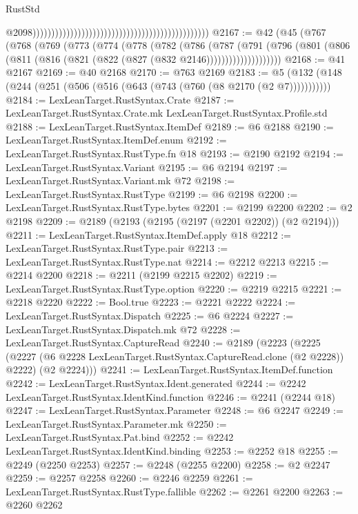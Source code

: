 \begin{lexlean}{RustStd}
\begin{coremodule}
                                                                                                  @2098)))))))))))))))))))))))))))))))))))))))))))))))
@2167 := @42
    (@45
      (@767
        (@768
          (@769
            (@773
              (@774
                (@778
                  (@782
                    (@786
                      (@787
                        (@791
                          (@796
                            (@801
                              (@806 (@811 (@816 (@821 (@822 (@827 (@832 @2146))))))))))))))))))))
@2168 := @41 @2167
@2169 := @40 @2168
@2170 := @763 @2169
@2183 := @5 (@132 (@148 (@244 (@251 (@506 (@516 (@643 (@743 (@760 (@8 @2170 (@2 @7)))))))))))
@2184 := LexLeanTarget.RustSyntax.Crate
@2187 := LexLeanTarget.RustSyntax.Crate.mk LexLeanTarget.RustSyntax.Profile.std
@2188 := LexLeanTarget.RustSyntax.ItemDef
@2189 := @6 @2188
@2190 := LexLeanTarget.RustSyntax.ItemDef.enum
@2192 := LexLeanTarget.RustSyntax.RustType.fn @18
@2193 := @2190 @2192
@2194 := LexLeanTarget.RustSyntax.Variant
@2195 := @6 @2194
@2197 := LexLeanTarget.RustSyntax.Variant.mk @72
@2198 := LexLeanTarget.RustSyntax.RustType
@2199 := @6 @2198
@2200 := LexLeanTarget.RustSyntax.RustType.bytes
@2201 := @2199 @2200
@2202 := @2 @2198
@2209 := @2189 (@2193 (@2195 (@2197 (@2201 @2202)) (@2 @2194)))
@2211 := LexLeanTarget.RustSyntax.ItemDef.apply @18
@2212 := LexLeanTarget.RustSyntax.RustType.pair
@2213 := LexLeanTarget.RustSyntax.RustType.nat
@2214 := @2212 @2213
@2215 := @2214 @2200
@2218 := @2211 (@2199 @2215 @2202)
@2219 := LexLeanTarget.RustSyntax.RustType.option
@2220 := @2219 @2215
@2221 := @2218 @2220
@2222 := Bool.true
@2223 := @2221 @2222
@2224 := LexLeanTarget.RustSyntax.Dispatch
@2225 := @6 @2224
@2227 := LexLeanTarget.RustSyntax.Dispatch.mk @72
@2228 := LexLeanTarget.RustSyntax.CaptureRead
@2240 := @2189
    (@2223
      (@2225
        (@2227 (@6 @2228 LexLeanTarget.RustSyntax.CaptureRead.clone (@2 @2228)) @2222)
        (@2 @2224)))
@2241 := LexLeanTarget.RustSyntax.ItemDef.function
@2242 := LexLeanTarget.RustSyntax.Ident.generated
@2244 := @2242 LexLeanTarget.RustSyntax.IdentKind.function
@2246 := @2241 (@2244 @18)
@2247 := LexLeanTarget.RustSyntax.Parameter
@2248 := @6 @2247
@2249 := LexLeanTarget.RustSyntax.Parameter.mk
@2250 := LexLeanTarget.RustSyntax.Pat.bind
@2252 := @2242 LexLeanTarget.RustSyntax.IdentKind.binding
@2253 := @2252 @18
@2255 := @2249 (@2250 @2253)
@2257 := @2248 (@2255 @2200)
@2258 := @2 @2247
@2259 := @2257 @2258
@2260 := @2246 @2259
@2261 := LexLeanTarget.RustSyntax.RustType.fallible
@2262 := @2261 @2200
@2263 := @2260 @2262

\end{coremodule}
\end{lexlean}
